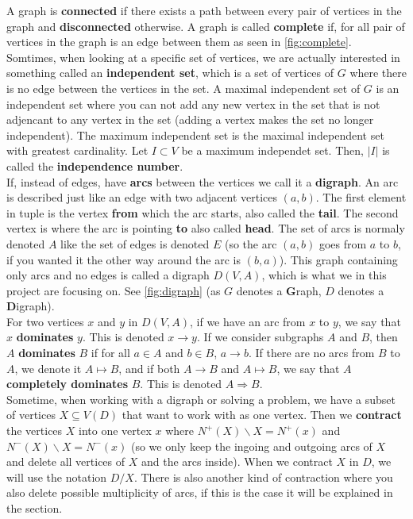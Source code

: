 A graph is \textbf{connected} if there exists a path between every pair of vertices in the graph and \textbf{disconnected} otherwise.
A graph is called \textbf{complete} if, for all pair of vertices in the graph is an edge between them as seen in \autoref{fig:complete}.\\
Somtimes, when looking at a specific set of vertices, we are actually interested in something called an \textbf{independent set}, which is a set of vertices of $G$ where there is no edge between the vertices in the set. 
A maximal independent set of $G$ is an independent set where you can not add any new vertex in the set that is not adjencant to any vertex in the set (adding a vertex makes the set no longer independent).  
The maximum independent set is the maximal independent set with greatest cardinality. 
Let $I\subset V$ be a maximum independet set. 
Then, $|I|$ is called the \textbf{independence number}. \\ 

If, instead of edges, have \textbf{arcs} between the vertices we call it a \textbf{digraph}.
An arc is described just like an edge with two adjacent vertices $(a,b)$. 
The first element in tuple is the vertex \textbf{from} which the arc starts, also called the \textbf{tail}. 
The second vertex is where the arc is pointing \textbf{to} also called \textbf{head}. 
The set of arcs is normaly denoted $A$ like the set of edges is denoted $E$ 
(so the arc $(a,b)$ goes from $a$ to $b$, if you wanted it the other way around the arc is $(b,a)$).
This graph containing only arcs and no edges is called a digraph $D(V,A)$, which is what we in this project are focusing on. 
See \autoref{fig:digraph} (as $G$ denotes a \textbf{G}raph, $D$ denotes a \textbf{D}igraph).\\
For two vertices $x$ and $y$ in $D(V,A)$, if we have an arc from $x$ to $y$, we say that $x$ \textbf{dominates} $y$. 
This is denoted $x \rightarrow y$. 
If we consider subgraphs $A$ and $B$, then $A$ \textbf{dominates} $B$ if for all $a\in A$ and $b\in B$, $a \rightarrow b$. 
If there are no arcs from $B$ to $A$, we denote it $A\mapsto B$, and if both $A\rightarrow B$ and $A \mapsto B$, we say that $A$ \textbf{completely dominates} $B$. This is denoted $A\Rightarrow B$.\\ 

Sometime, when working with a digraph or solving a problem, we have a subset of vertices $X\subseteq V(D)$ that want to work with as one vertex. 
Then we \textbf{contract} the vertices $X$ into one vertex $x$ where $N^+(X)\backslash X=N^+(x)$ and $N^-(X)\backslash X=N^-(x)$ (so we only keep the ingoing and outgoing arcs of $X$ and delete all vertices of $X$ and the arcs inside). When we contract $X$ in $D$, we will use the notation $D/X$. There is also another kind of contraction where you also delete possible multiplicity of arcs, if this is the case it will be explained in the section.\\

